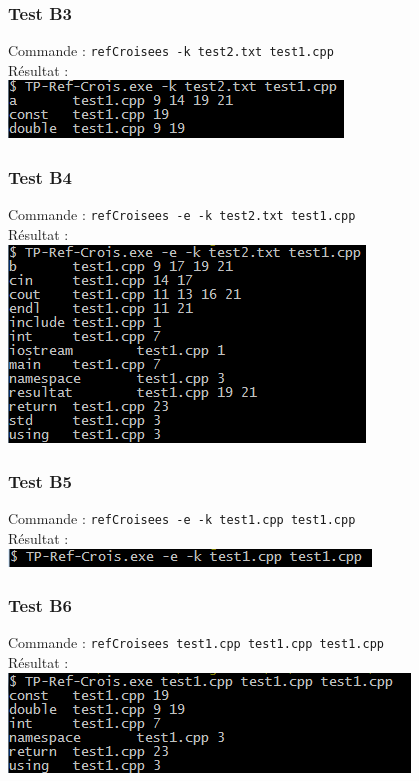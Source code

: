 \documentclass[a4paper,french,10pt,twoside]{article}
\begin{document}
\subsubsection{Test B3}
Commande : \verb!refCroisees -k test2.txt test1.cpp!\\
R\'esultat :\\
\newline
\includegraphics{images/testB3.png}

\subsubsection{Test B4}
Commande : \verb!refCroisees -e -k test2.txt test1.cpp!\\
R\'esultat :\\
\newline
\includegraphics{images/testB4.png}

\subsubsection{Test B5}
Commande : \verb!refCroisees -e -k test1.cpp test1.cpp!\\
R\'esultat :\\
\newline
\includegraphics{images/testB5.png}

\subsubsection{Test B6}
Commande : \verb!refCroisees test1.cpp test1.cpp test1.cpp!\\
R\'esultat :\\
\newline
\includegraphics{images/testB6.png}
\end{document}
